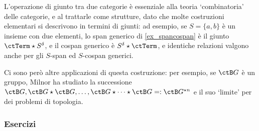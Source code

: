 L'operazione di giunto tra due categorie è essenziale alla teoria `combinatoria' delle categorie, e al trattarle come strutture, dato che molte costruzioni elementari si descrivono in termini di giunti: ad esempio, se \(S=\{a,b\}\) è un insieme con due elementi, lo span generico di \ref{ex_spancospan} è il giunto \(\ctTerm\star S^\delta\), e il cospan generico è \(S^\delta\star\ctTerm\), e identiche relazioni valgono anche per gli \(S\)-span ed \(S\)-cospan generici.

Ci sono però altre applicazioni di questa costruzione: per esempio, se \(\ctB G\) è un gruppo, Milnor \cite{milnor1,milnor2} ha studiato la successione \(\ctB G, \ctB G\star\ctB G, \dots, \ctB G \star\dots\star \ctB G =:\ctB G^{\star n}\) e il suo `limite' per dei problemi di topologia.
\subsubsection*{Esercizi}
